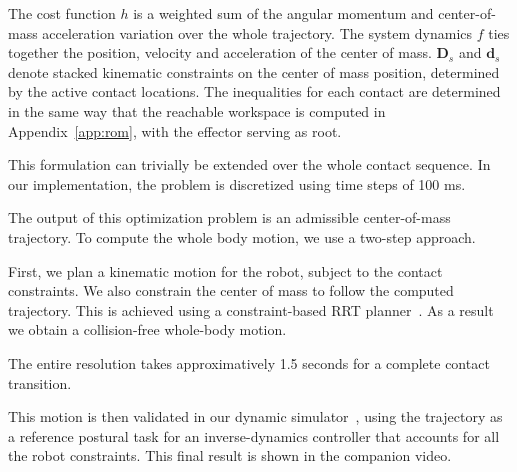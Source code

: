 The cost function $h$ is a weighted sum of the angular momentum and center-of-mass acceleration variation over the whole trajectory. 
The system dynamics $f$ ties together the position, velocity and acceleration of the center of mass. 
$\mathbf{D}_s$ and $\mathbf{d}_s$ denote stacked kinematic constraints on the center of mass position, determined by the active contact locations.
The inequalities for each contact are determined in the same way that the reachable workspace is computed in Appendix~\ref{app:rom}, with
the effector serving as root. %

This formulation can trivially be extended over the whole contact sequence.
In our implementation, the problem is discretized using time steps of 100 ms. 

The output of this optimization problem is an admissible center-of-mass trajectory.
To compute the whole body motion, we use a two-step approach.

First, we plan a kinematic motion for the robot, subject to the contact constraints. We also constrain the center of mass to follow
the computed trajectory. This is achieved using a constraint-based RRT planner~\citep{7759083}. As a result we obtain a collision-free whole-body motion.

The entire resolution takes approximatively 1.5 seconds for a complete contact transition.

This motion is then validated in our dynamic simulator~\citep{DelPrete2015b}, using the trajectory as a reference postural task for an inverse-dynamics
controller that accounts for all the robot constraints. This final result is shown in the companion video.
